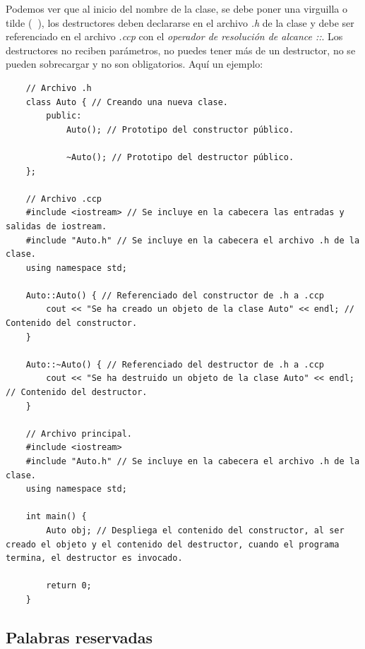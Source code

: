 Podemos ver que al inicio del nombre de la clase, se debe poner una virguilla o tilde (\textbf{~}), los destructores deben declararse en el archivo \textit{.h} de la clase y debe ser referenciado en el archivo \textit{.ccp} con el \textit{operador de resolución de alcance ::}. Los destructores no reciben parámetros, no puedes tener más de un destructor, no se pueden sobrecargar y no son obligatorios. Aquí un ejemplo:
\begin{lstlisting}
    // Archivo .h
    class Auto { // Creando una nueva clase.
        public:
            Auto(); // Prototipo del constructor público.
            
            ~Auto(); // Prototipo del destructor público.
    };
    
    // Archivo .ccp
    #include <iostream> // Se incluye en la cabecera las entradas y salidas de iostream.
    #include "Auto.h" // Se incluye en la cabecera el archivo .h de la clase.
    using namespace std;
    
    Auto::Auto() { // Referenciado del constructor de .h a .ccp
        cout << "Se ha creado un objeto de la clase Auto" << endl; // Contenido del constructor.
    }
    
    Auto::~Auto() { // Referenciado del destructor de .h a .ccp
        cout << "Se ha destruido un objeto de la clase Auto" << endl; // Contenido del destructor.
    }
    
    // Archivo principal.
    #include <iostream>
    #include "Auto.h" // Se incluye en la cabecera el archivo .h de la clase.
    using namespace std;
    
    int main() {
        Auto obj; // Despliega el contenido del constructor, al ser creado el objeto y el contenido del destructor, cuando el programa termina, el destructor es invocado.
        
        return 0;
    }
\end{lstlisting}


\subsection{Palabras reservadas}



